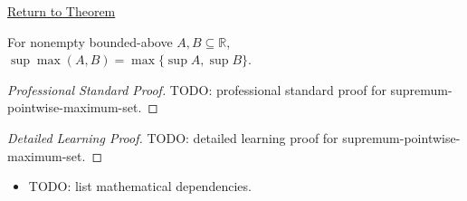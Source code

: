 \newpage
{}
\label{prf:supremum-pointwise-maximum-set}

\begin{remark*}[Return]
\hyperref[thm:supremum-pointwise-maximum-set]{Return to Theorem}
\end{remark*}

\begin{theorem*}
For nonempty bounded-above $A,B\subseteq\mathbb{R}$,
$\sup\max(A,B)=\max\{\sup A,\sup B\}$.
\end{theorem*}

\begin{proof}[Professional Standard Proof]
\LRAProofBodyStart
TODO: professional standard proof for supremum-pointwise-maximum-set.
\end{proof}

\begin{proof}[Detailed Learning Proof]
\LRAProofBodyStart
TODO: detailed learning proof for supremum-pointwise-maximum-set.
\end{proof}

\begin{remark*}
\end{remark*}

\begin{dependencies}
\begin{itemize}
  \item TODO: list mathematical dependencies.
\end{itemize}
\end{dependencies}

\clearpage
